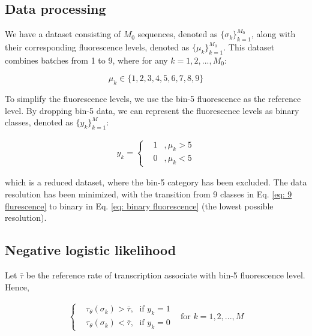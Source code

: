 \documentclass{article}
\begin{document}
\subsection{Data processing}\label{sec: downsampling}

We have a dataset consisting of $M_0$ sequences, denoted as $\{\sigma_k\}_{k=1}^{M_0}$, along with their corresponding fluorescence levels, denoted as $\{\mu_k\}_{k=1}^{M_0}$. This dataset combines batches from 1 to 9, where for any $k=1,2,...,M_0$:

\begin{equation}\label{eq: 9 flurescence}
    \mu_k \in \{1,2,3,4,5,6,7,8,9\}
\end{equation}

To simplify the fluorescence levels, we use the bin-5 fluorescence as the reference level. By dropping bin-5 data, we can represent the fluorescence levels as binary classes, denoted as $\{y_k\}_{k=1}^M$:

\begin{equation}\label{eq: binary fluorescence}
\begin{aligned}
y_k=\left\{
\begin{aligned}
& 1 &,\mu_k > 5 \\
& 0 &,\mu_k < 5
\end{aligned}
\right.
\end{aligned}
\end{equation}

\noindent which is a reduced dataset, where the bin-5 category has been excluded. The data resolution has been minimized, with the transition from 9 classes in Eq. \ref{eq: 9 flurescence} to binary in Eq. \ref{eq: binary fluorescence} (the lowest possible resolution).

\subsection{Negative logistic likelihood}

Let $\bar{\tau}$ be the reference rate of transcription associate with bin-5 fluorescence level. Hence,

\begin{equation}
\begin{aligned}
\left\{
\begin{aligned}
& \tau_\theta (\sigma_k) > \bar{\tau}, \;\text{ if } y_k = 1 \\
& \tau_\theta (\sigma_k) < \bar{\tau}, \;\text{ if } y_k =0 
\end{aligned}
\right.\;\;\;\text{for } k = 1, 2, ..., M 
\end{aligned}
\end{equation}
\end{document}
